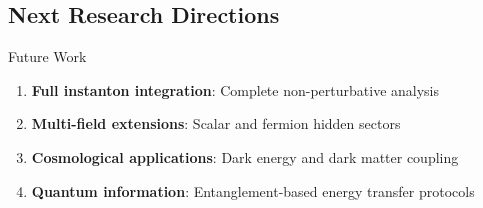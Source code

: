 \documentclass[12pt]{article}
\begin{document}
\subsection{Next Research Directions}

\begin{resultbox}{Future Work}
\begin{enumerate}
\item \textbf{Full instanton integration}: Complete non-perturbative analysis
\item \textbf{Multi-field extensions}: Scalar and fermion hidden sectors
\item \textbf{Cosmological applications}: Dark energy and dark matter coupling
\item \textbf{Quantum information}: Entanglement-based energy transfer protocols
\end{enumerate}
\end{resultbox}



\end{document}
